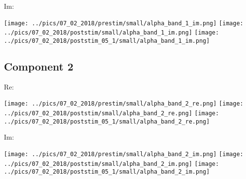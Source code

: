 \documentclass{article}
\begin{document}
Im:

\hspace{0.5cm}
\texttt{[image: ../pics/07\_02\_2018/prestim/small/alpha\_band\_1\_im.png]}
\hspace{0.5cm}
\texttt{[image: ../pics/07\_02\_2018/poststim/small/alpha\_band\_1\_im.png]}
\hspace{0.5cm}
\texttt{[image: ../pics/07\_02\_2018/poststim\_05\_1/small/alpha\_band\_1\_im.png]}

\subsection*{Component 2}
Re:

\hspace{0.5cm}
\texttt{[image: ../pics/07\_02\_2018/prestim/small/alpha\_band\_2\_re.png]}
\hspace{0.5cm}
\texttt{[image: ../pics/07\_02\_2018/poststim/small/alpha\_band\_2\_re.png]}
\hspace{0.5cm}
\texttt{[image: ../pics/07\_02\_2018/poststim\_05\_1/small/alpha\_band\_2\_re.png]}

Im:

\hspace{0.5cm}
\texttt{[image: ../pics/07\_02\_2018/prestim/small/alpha\_band\_2\_im.png]}
\hspace{0.5cm}
\texttt{[image: ../pics/07\_02\_2018/poststim/small/alpha\_band\_2\_im.png]}
\hspace{0.5cm}
\texttt{[image: ../pics/07\_02\_2018/poststim\_05\_1/small/alpha\_band\_2\_im.png]}

\end{document}
